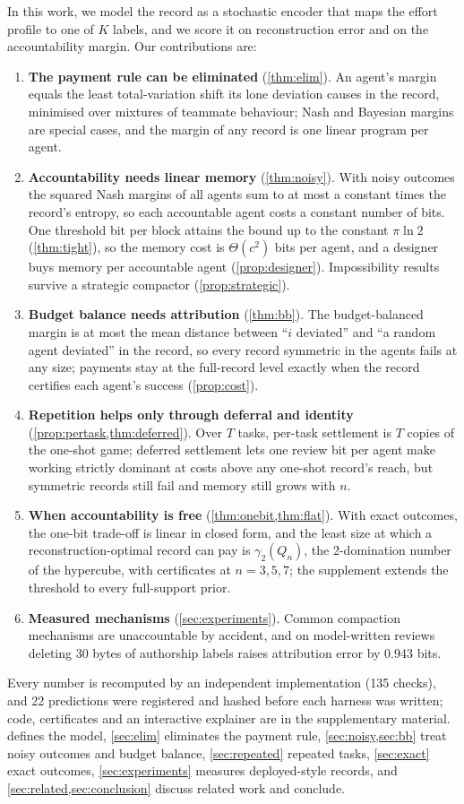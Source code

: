 \documentclass[sigconf,anonymous,acmthm=false]{acmart}
\theoremstyle{acmplain}
\theoremstyle{acmdefinition}
\begin{document}
In this work, we model the record as a stochastic encoder that maps the effort profile to
one of $K$ labels, and we score it on reconstruction error and on the accountability margin.
Our contributions are:
\begin{enumerate}
\item \textbf{The payment rule can be eliminated} (\cref{thm:elim}). An agent's margin
equals the least total-variation shift its lone deviation causes in the record, minimised
over mixtures of teammate behaviour; Nash and Bayesian margins are special cases, and the
margin of any record is one linear program per agent.
\item \textbf{Accountability needs linear memory} (\cref{thm:noisy}). With noisy outcomes the
squared Nash margins of all agents sum to at most a constant times the record's entropy, so
each accountable agent costs a constant number of bits. One threshold bit per block attains
the bound up to the constant $\pi\ln2$ (\cref{thm:tight}), so the memory cost is
$\Theta(c^2)$ bits per agent, and a designer buys memory per accountable agent
(\cref{prop:designer}). Impossibility results survive a strategic compactor
(\cref{prop:strategic}).
\item \textbf{Budget balance needs attribution} (\cref{thm:bb}). The budget-balanced margin is
at most the mean distance between ``$i$ deviated'' and ``a random agent deviated'' in the
record, so every record symmetric in the agents fails at any size; payments stay at the
full-record level exactly when the record certifies each agent's success
(\cref{prop:cost}).
\item \textbf{Repetition helps only through deferral and identity} (\cref{prop:pertask,thm:deferred}).
Over $T$ tasks, per-task settlement is $T$ copies of the one-shot game; deferred settlement
lets one review bit per agent make working strictly dominant at costs above any one-shot
record's reach, but symmetric records still fail and memory still grows with $n$.
\item \textbf{When accountability is free} (\cref{thm:onebit,thm:flat}). With exact
outcomes, the one-bit trade-off is linear in closed form, and the least size at which a
reconstruction-optimal record can pay is $\gamma_2(Q_n)$, the 2-domination number of the
hypercube, with certificates at $n=3,5,7$; the supplement extends the threshold to every
full-support prior.
\item \textbf{Measured mechanisms} (\cref{sec:experiments}). Common compaction mechanisms are
unaccountable by accident, and on model-written reviews deleting 30 bytes of authorship
labels raises attribution error by 0.943 bits.
\end{enumerate}
Every number is recomputed by an independent implementation (135 checks), and 22
predictions were registered and hashed before each harness was written; code, certificates
and an interactive explainer are in the supplementary material. 
defines the model, \cref{sec:elim} eliminates the payment rule, \cref{sec:noisy,sec:bb}
treat noisy outcomes and budget balance, \cref{sec:repeated} repeated tasks,
\cref{sec:exact} exact outcomes,
\cref{sec:experiments} measures deployed-style records, and
\cref{sec:related,sec:conclusion} discuss related work and conclude.
\end{document}
